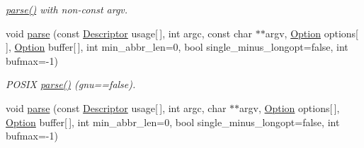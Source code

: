 \begin{DoxyCompactItemize}
\begin{DoxyCompactList}\small\item\em \hyperlink{classoption_1_1Parser_a6e0b5778d1cfbd6cd51240e74d01e138}{parse()} with non-\/const argv. \end{DoxyCompactList}\item 
void \hyperlink{classoption_1_1Parser_a41885a7308249c8532714e15b36106bd}{parse} (const \hyperlink{structoption_1_1Descriptor}{Descriptor} usage\mbox{[}$\,$\mbox{]}, int argc, const char $\ast$$\ast$argv, \hyperlink{classoption_1_1Option}{Option} options\mbox{[}$\,$\mbox{]}, \hyperlink{classoption_1_1Option}{Option} buffer\mbox{[}$\,$\mbox{]}, int min\+\_\+abbr\+\_\+len=0, bool single\+\_\+minus\+\_\+longopt=false, int bufmax=-\/1)\hypertarget{classoption_1_1Parser_a41885a7308249c8532714e15b36106bd}{}\label{classoption_1_1Parser_a41885a7308249c8532714e15b36106bd}

\begin{DoxyCompactList}\small\item\em P\+O\+S\+IX \hyperlink{classoption_1_1Parser_a6e0b5778d1cfbd6cd51240e74d01e138}{parse()} (gnu==false). \end{DoxyCompactList}\item 
void \hyperlink{classoption_1_1Parser_ad40585faa23a97a186cf9a45b8c2b42b}{parse} (const \hyperlink{structoption_1_1Descriptor}{Descriptor} usage\mbox{[}$\,$\mbox{]}, int argc, char $\ast$$\ast$argv, \hyperlink{classoption_1_1Option}{Option} options\mbox{[}$\,$\mbox{]}, \hyperlink{classoption_1_1Option}{Option} buffer\mbox{[}$\,$\mbox{]}, int min\+\_\+abbr\+\_\+len=0, bool single\+\_\+minus\+\_\+longopt=false, int bufmax=-\/1)\hypertarget{classoption_1_1Parser_ad40585faa23a97a186cf9a45b8c2b42b}{}\label{classoption_1_1Parser_ad40585faa23a97a186cf9a45b8c2b42b}


\end{DoxyCompactItemize}
